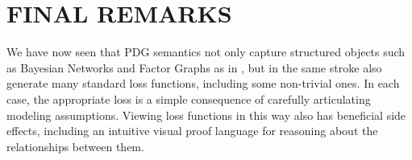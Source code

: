 \documentclass[twoside]{article}
\makeatletter
\newif\ifmarginprooflinks
\theoremstyle{plain}
\theoremstyle{definition}
\DeclareMathOperator*{\Ex}{\mathbb{E}} %
\newcommand{\datadist}[1]{\Pr\nolimits_{#1}}
\newcommand{\V}{\mathcal V}
\newcommand\aar{\@ifstar\aar@one@star\aar@plain}
\newcommand\aar@one@star{\@ifstar\aar@resize{\aar@plain*}}
\newcommand\aar@resize[1]{\sbox{\aar@content}{#1}\scaleleftright[3.8ex]
			{\Biggl\langle\!\!\!\!\Biggl\langle}{\usebox{\aar@content}}
			{\Biggr\rangle\!\!\!\!\Biggr\rangle}}
\newenvironment{linked}[3][]{%
			\def\linkedproof{#3}%
			\def\linkedtype{#2}%
			\ifmarginprooflinks
			\marginpar{%
				\vspace{1.5em}
				\centering%
				\hyperref[proof:\linkedproof]{%
				\color{blue!30!white}%
				\scaleleftright{$\Big[$}{\,\mbox{\footnotesize\centering\tt\begin{tabular}{@{}c@{}}
					link to\\[-0.15em]
					proof
				\end{tabular}}\,}{$\Big]$}}~
				}%
			\fi
	        \restatable[#1]{#2}{#2:#3}\label{#2:#3}%
	        }%
			{\endrestatable%
			}
\makeatother
\begin{document}
%
%
%
%
%
%
%
%


\section{FINAL REMARKS}


We have now seen that PDG semantics not only capture structured objects such as Bayesian Networks and Factor Graphs as in \textcite{richardson2020probabilistic},
but in the same stroke also generate
%
many standard loss functions, including some non-trivial ones.
In each case, the appropriate loss is a simple consequence of carefully articulating modeling assumptions.
Viewing loss functions in this way also has beneficial side effects, including an intuitive visual proof language for reasoning about the relationships between them.
\end{document}
